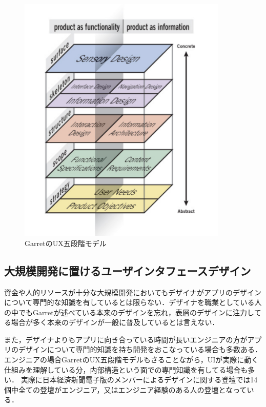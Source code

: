 \begin{figure}[htbp]
  \begin{minipage}{\hsize}
    \begin{center}
       \includegraphics[width=100mm]{img/uxmodel.png}
    \end{center}
    \caption{GarretのUX五段階モデル\cite{garrett2010elements}}
    \label{fig:garretuxmodel}
  \end{minipage}
\end{figure}

\subsection{大規模開発に置けるユーザインタフェースデザイン}
資金や人的リソースが十分な大規模開発においてもデザイナがアプリのデザインについて専門的な知識を有しているとは限らない．デザイナを職業としている人の中でもGarretが述べている本来のデザインを忘れ，表層のデザインに注力してる場合が多く本来のデザインが一般に普及しているとは言えない．

また，デザイナよりもアプリに向き合っている時間が長いエンジニアの方がアプリのデザインについて専門的知識を持ち開発をおこなっている場合も多数ある．エンジニアの場合GarretのUX五段階モデルもさることながら，UIが実際に動く仕組みを理解している分，内部構造という面での専門知識を有してる場合も多い．
実際に日本経済新聞電子版のメンバーによるデザインに関する登壇では14個中全ての登壇がエンジニア，又はエンジニア経験のある人の登壇となっている．\cite{nikkeislide}


